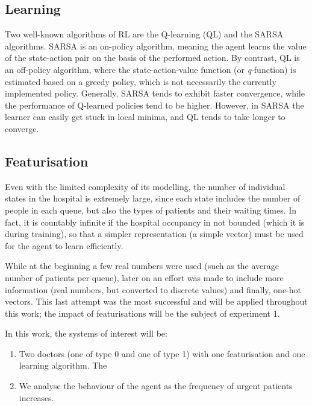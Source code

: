 \documentclass[11point]{article}
\begin{document}
\subsection{Learning}
Two well-known algorithms of RL are the Q-learning (QL) and the SARSA algorithms. \cite{sutton2018reinforcement}
SARSA is an on-policy algorithm,
meaning the agent learns the value of the state-action pair on the basis of the performed action.
By contrast, QL is an off-policy algorithm, where the state-action-value function (or \textit{q}-function) is estimated based on a greedy policy, which is not necessarily the currently implemented policy.
Generally, SARSA tends to exhibit faster convergence, while the performance of Q-learned policies tend to be higher. 
However, in SARSA the learner can easily get stuck in local minima, and QL tends to take longer to converge.

\subsection{Featurisation}

Even with the limited complexity of its modelling, the number of individual states in the hospital is extremely large, since each state includes the number of people in each queue, but also the types of patients and their waiting times.
In fact, it is countably infinite if the hospital occupancy in not bounded (which it is during training), so that a simpler representation (a simple vector) must be used for the agent to learn efficiently.

While at the beginning a few real numbers were used (such as the average number of patients per queue), later on an effort was made to include more information (real numbers, but converted to discrete values) and finally, one-hot vectors.
This last attempt was the most successful and will be applied throughout this work; the impact of featurisations will be the subject of experiment 1.

In this work, the systems of interest will be:
\begin{enumerate}[\bfseries {Experiment} 1:, wide, labelwidth=!, labelindent=0pt]
    \item Two doctors (one of type 0 and one of type 1) with one featurisation and one learning algorithm. The 
    \item
    We analyse the behaviour of the agent as the frequency of urgent patients increases.
\end{enumerate}{}
\end{document}
